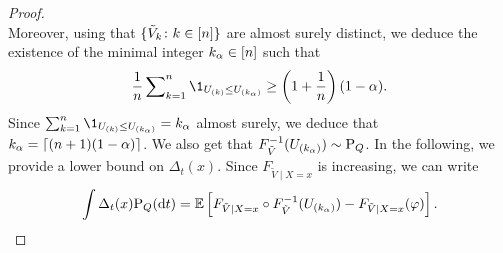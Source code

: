 \begin{proof}
\begin{equation*}
  \end{equation*}
  Moreover, using that $\{\tilde{V}_k\colon k\in[n]\}$ are almost surely distinct, we deduce the existence of the minimal integer $k_{\alpha}\in[n]$ such that
  \begin{equation*}
    \frac{1}{\tcount} \sum\nolimits_{k=1}^{\tcount} \1_{U_{(k)}\le U_{(k_{\alpha})}} 
    \ge \pr{1+\frac{1}{\tcount}} (1-\alpha).
  \end{equation*}
  Since $\sum\nolimits_{k=1}^{\tcount} \1_{U_{(k)}\le U_{(k_{\alpha})}} = k_{\alpha}$ almost surely, we deduce that $k_{\alpha} = \lceil (n+1) (1-\alpha) \rceil$. 
  We also get that $F_{\tilde{V}}^{-1}(U_{(k_{\alpha})})\sim \textup{P}_{Q}$.
  In the following, we provide a lower bound on $\Delta_{t}(x)$.
  Since $F_{\tilde{V}\mid X=x}$ is increasing, we can write
  \begin{equation}\label{eq:eq:int-delta-PQ}
    \int \Delta_{t}(x) \textup{P}_Q(\mathrm{d} t)
    = \mathbb{E}\left[{F_{\tilde{V}\mid X=x}\circ F_{\tilde{V}}^{-1}(U_{(k_{\alpha})}) - F_{\tilde{V}\mid X=x}(\varphi)}\right].
  \end{equation}


\end{proof}
